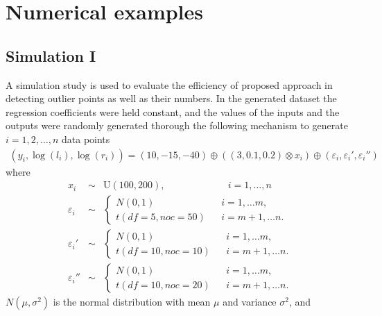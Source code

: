 \documentclass{IJFS}
\begin{document}
\section{Numerical examples}\label{Exam}
\subsection{Simulation I}
A simulation study is used to evaluate the efficiency of proposed approach in detecting outlier points as well as their numbers.
In the generated dataset the regression coefficients were held constant, and the values of the inputs and the outputs were randomly generated thorough the following mechanism to generate  $i=1,2,\ldots, n$  data points
\begin{eqnarray*}
(y_i,\log(l_i),\log(r_i))=(10,   -15,   -40)\oplus((3,    0.1,   0.2)\otimes x_i)\oplus(\varepsilon_i,\varepsilon_i',\varepsilon_i'')
\end{eqnarray*}
where
\begin{eqnarray*}
x_{i}            &\sim&   \textrm{U}(100,200),     ~~\qquad\qquad\qquad i=1,\ldots, n\\
\varepsilon_i    &\sim& \left\{
\begin{array}{lcl}
N(0,1)           &    & i=1,\ldots m,\\
t(df=5,  noc=50) &    & i=m+1,\ldots n.
\end{array}
\right.\\
\varepsilon_i'   &\sim& \left\{
\begin{array}{lcl}
N(0,1)           &    & i=1,\ldots m,\\
t(df=10, noc=10) &    & i=m+1,\ldots n.
\end{array}
\right.\\
\varepsilon_i''  &\sim& \left\{
\begin{array}{lcl}
N(0,1)           &    & i=1,\ldots m,\\
t(df=10, noc=20) &    & i=m+1,\ldots n.
\end{array}
\right.
\end{eqnarray*}
$N(\mu,\sigma^2)$ is the normal distribution with mean $\mu$ and variance $\sigma^2$, and
\end{document}
